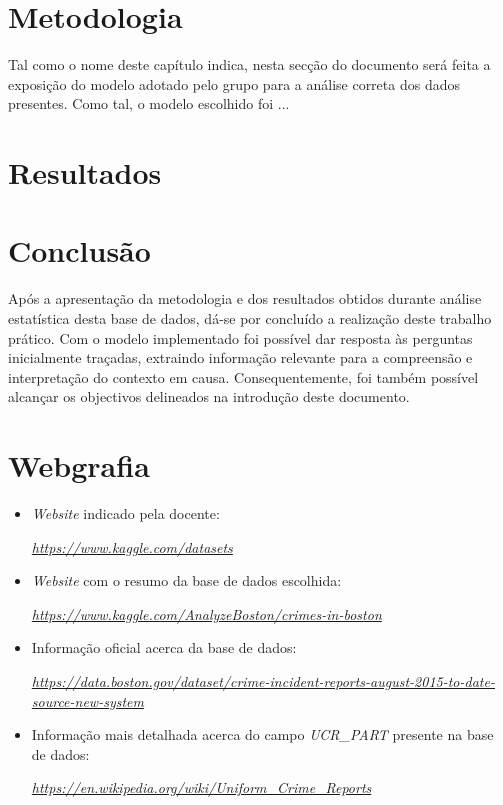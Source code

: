 \documentclass[a4paper]{report}
\begin{document}
\chapter{Metodologia}
\large{
	Tal como o nome deste capítulo indica, nesta secção do documento será feita a exposição do modelo adotado pelo grupo para a análise correta dos dados presentes. Como tal, o modelo 
	escolhido foi ...
}

\chapter{Resultados}

\chapter{Conclusão}
\large{
	Após a apresentação da metodologia e dos resultados obtidos durante análise estatística desta base de dados, dá-se por concluído a realização deste trabalho prático. Com o modelo 
	implementado foi possível dar resposta às perguntas inicialmente traçadas, extraindo informação relevante para a compreensão e interpretação do contexto em causa. Consequentemente, 
	foi também possível alcançar os objectivos delineados na introdução deste documento.
}

\chapter{Webgrafia}
	\begin{itemize}
		\item \textit{Website} indicado pela docente:
		\par \textit{\url{https://www.kaggle.com/datasets}}
        \item \textit{Website} com o resumo da base de dados escolhida:
        \par \textit{\url{https://www.kaggle.com/AnalyzeBoston/crimes-in-boston}}
        \item Informação oficial acerca da base de dados:
		\par \textit{\url{https://data.boston.gov/dataset/crime-incident-reports-august-2015-to-date-source-new-system}}
		\item Informação mais detalhada acerca do campo \textit{UCR\_PART} presente na base de dados:
		\par \textit{\url{https://en.wikipedia.org/wiki/Uniform\_Crime\_Reports}}
    \end{itemize}
\end{document}
